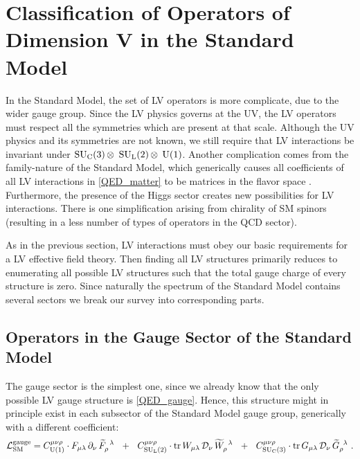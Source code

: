 \documentclass[12pt,preprintnumbers,nofootinbib]{revtex4}
\newcommand{\wt}{\widetilde}
\newcommand{\suc}{{{\rm SU}_{\rm C}(3)}}
\newcommand{\sul}{{{\rm SU}_{\rm L}(2)}}
\newcommand{\ue}{{{\rm U}(1)}}
\begin{document}
\section{Classification of Operators of Dimension V in the Standard Model}

	In the Standard Model, the set of LV operators is more complicate,
	due to the wider gauge group. 
	Since the LV physics governs at the UV, the LV operators must 
	respect all the symmetries which are present at that scale.
	Although the UV physics and its symmetries are not known, we
	still require that LV interactions be invariant under 
	$ \suc\, \otimes $ $ \sul\, \otimes $ $ \ue $.
	Another complication comes from the family-nature of the
	Standard Model, which generically causes all coefficients
	of all LV interactions in \eqref{QED_matter} to be 
	matrices in the flavor space
\cite{Colladay:1998fq}.
	Furthermore, the presence of the Higgs sector creates new
	possibilities for LV interactions. 
	There is one simplification arising from chirality of
	SM spinors (resulting in a less number of types of operators in the 
	QCD sector).

	As in the previous section, LV interactions must obey 
	our basic requirements for a LV effective field theory.
	Then finding all LV structures primarily reduces to enumerating all 
	possible LV structures
	such that the total gauge charge of every structure is zero.
	Since naturally the spectrum of the Standard Model contains
	several sectors we break our survey into corresponding parts.
	
\subsection{Operators in the Gauge Sector of the Standard Model}

	The gauge sector is the simplest one, since we already know
	that the only possible LV gauge structure is 
	\eqref{QED_gauge}.
	Hence, this structure might in principle exist in each subsector
	of the Standard Model gauge group, generically with a different
	coefficient:
\begin{equation}
\label{SM_gauge}
	\mathcal{L}_{\rm SM}^{\rm gauge} = 
	C_{\ue}^{\mu\nu\rho} \cdot 
	F_{\mu\lambda} \,\partial_\nu\, \wt{F}_\rho^{\phantom{\rho}\lambda}
	~~+~~
	C_{\sul}^{\mu\nu\rho} \cdot 
	{\rm tr}\,
	W_{\mu\lambda} \,\mathcal{D}_\nu\, \wt{W}_\rho^{\phantom{\rho}\lambda}
	~~+~~
	C_{\suc}^{\mu\nu\rho} \cdot 
	{\rm tr}\,
	G_{\mu\lambda} \,\mathcal{D}_\nu\, \wt{G}_\rho^{\phantom{\rho}\lambda}
	~.
\end{equation}
\end{document}
